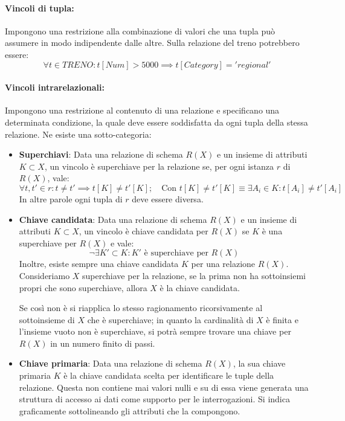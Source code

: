 \paragraph{Vincoli di tupla:} Impongono una restrizione alla combinazione di valori che una tupla può assumere in modo indipendente dalle altre. Sulla
relazione del treno potrebbero essere: \[
    \forall t\in TRENO : t[Num] > 5000 \implies t[Category] = 'regional'
\]

\paragraph{Vincoli intrarelazionali:} Impongono una restrizione al contenuto di una relazione e specificano una determinata condizione, la quale deve
essere soddisfatta da ogni tupla della stessa relazione. Ne esiste una sotto-categoria: \begin{itemize}
    \item \textbf{Superchiavi}: Data una relazione di schema $R(X)$ e un insieme di attributi $K\subset X$, un vincolo è superchiave per la relazione se,
        per ogni istanza $r$ di $R(X)$, vale: \[
        \forall t, t'\in r:t\neq t' \implies t[K]\neq t'[K];\quad\text{Con } t[K]\neq t'[K] \equiv \exists A_i\in K : t[A_i]\neq t'[A_i]
        \]
        \noindent In altre parole ogni tupla di $r$ deve essere diversa.
    \item \textbf{Chiave candidata}: Data una relazione di schema $R(X)$ e un insieme di attributi $K\subset X$, un vincolo è chiave candidata per
        $R(X)$ se $K$ è una superchiave per $R(X)$ e vale: \[
        \neg\exists K'\subset K : K' \text{ è superchiave per } R(X)
        \]
        \noindent Inoltre, esiste sempre una chiave candidata $K$ per una relazione $R(X)$. Consideriamo $X$ superchiave per la relazione, se la prima
        non ha sottoinsiemi propri che sono superchiave, allora $X$ è la chiave candidata.\par
        Se così non è si riapplica lo stesso ragionamento ricorsivamente al sottoinsieme di $X$ che è superchiave; in quanto la cardinalità di $X$ è
        finita e l'insieme vuoto non è superchiave, si potrà sempre trovare una chiave per $R(X)$ in un numero finito di passi.
    \item \textbf{Chiave primaria}: Data una relazione di schema $R(X)$, la sua chiave primaria $K$ è la chiave candidata scelta per identificare le
        tuple della relazione. Questa non contiene mai valori nulli e su di essa viene generata una struttura di accesso ai dati come supporto per le
        interrogazioni. Si indica graficamente sottolineando gli attributi che la compongono.
\end{itemize}

